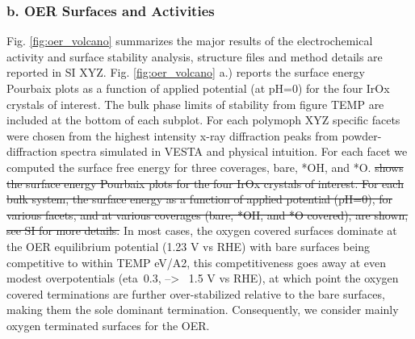 \subsubsection{b. OER Surfaces and Activities}

Fig. \ref{fig:oer_volcano} summarizes the major results of the electrochemical activity and surface stability analysis, structure files and method details are reported in SI XYZ.
%
Fig. \ref{fig:oer_volcano} a.) reports the surface energy Pourbaix plots as a function of applied potential (at pH=0) for the four IrOx crystals of interest. The bulk phase limits of stability from figure TEMP are included at the bottom of each subplot.  For each polymoph XYZ specific facets were chosen from the highest intensity x-ray diffraction peaks from powder-diffraction spectra simulated in VESTA and physical intuition. For each facet we computed the surface free energy for three coverages, bare, *OH, and *O.
\sout{shows the surface energy Pourbaix plots for the four IrOx crystals of interest. For each bulk system, the surface energy as a function of applied potential (pH=0), for various facets, and at various coverages (bare, *OH, and *O covered), are shown, see SI for more details.}
%
In most cases, the oxygen covered surfaces dominate at the OER equilibrium potential (1.23 V vs RHE) with bare surfaces being competitive to within TEMP eV/A2,
this competitiveness goes away at even modest overpotentials (eta~0.3, --> ~1.5 V vs RHE),
at which point the oxygen covered terminations are further over-stabilized relative to the bare surfaces,
making them the sole dominant termination. Consequently, we consider mainly  oxygen terminated surfaces for the OER.\\
%

